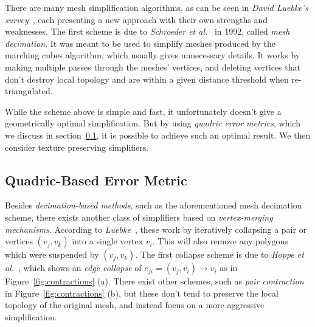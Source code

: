 There are many mesh simplification algorithms, as can be seen in \emph{David Luebke's survey}~\cite{luebke2001developer}, each presenting a new approach with their own strengths and weaknesses. The first scheme is due to \emph{Schroeder et al.}~\cite{schroeder1992decimation} in 1992, called \emph{mesh decimation}. It was meant to be used to simplify meshes produced by the marching cubes algorithm, which usually gives unnecessary details. It works by making multiple passes through the meshes' vertices, and deleting vertices that don't destroy local topology and are within a given distance threshold when re-triangulated.

While the scheme above is simple and fast, it unfortunately doesn't give a geometrically optimal simplification. But by using \emph{quadric error metrics}, which we discuss in section~\ref{sec:quadric-based_error_metric}, it is possible to achieve such an optimal result. We then consider texture preserving simplifiers.

\subsection{Quadric-Based Error Metric} \label{sec:quadric-based_error_metric}

Besides \emph{decimation-based methods}, such as the aforementioned mesh decimation scheme, there exists another class of simplifiers based on \emph{vertex-merging mechanisms}. According to \emph{Luebke}~\cite{luebke2001developer}, these work by iteratively collapsing a pair or vertices \((v_j, v_k)\) into a single vertex \(v_i\). This will also remove any polygons which were suspended by \((v_j, v_k)\). The first collapse scheme is due to \emph{Hoppe et al.}~\cite{hoppe1993mesh}, which shows an \emph{edge collapse} of \(e_{ji} = (v_j, v_i) \rightarrow v_i\) as in Figure~\ref{fig:contractions} (a). There exist other schemes, such as \emph{pair contraction} in Figure~\ref{fig:contractions} (b), but these don't tend to preserve the local topology of the original mesh, and instead focus on a more aggressive simplification.

